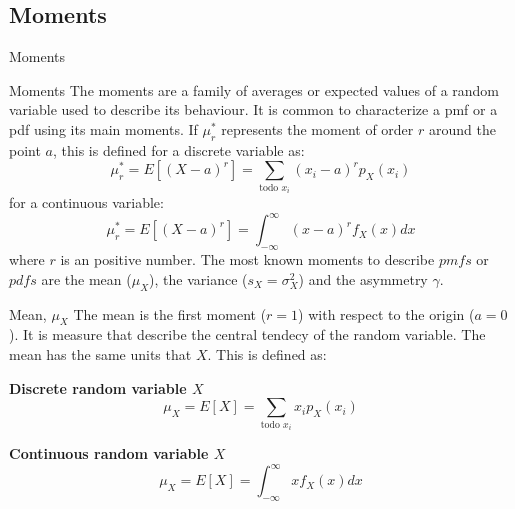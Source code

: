 \documentclass[8pt]{beamer}
\renewcommand{\emph}[1]{\textcolor{myorange}{#1}}
\begin{document}
\subsection{Moments}
\begin{frame}{Moments}
    
    \begin{block}{Moments}
        The \alert{moments} are a family of averages or expected values of a random variable used to describe its behaviour. It is common to characterize a \emph{pmf} or a \emph{pdf} using its main moments. If $\mu_r^*$ represents the moment of order $r$ around the point $a$, this is defined  for a discrete variable as:
        \[
            \mu_r^* = E \left[(X - a)^r \right] = \sum_{\text{todo $x_i$}} (x_i - a)^r p_X (x_i) 
        \]
for a continuous variable:
        \[
            \mu_r^* = E \left[(X - a)^r \right] = \int_{-\infty}^{\infty} (x- a)^r f_X (x) dx
        \]
        where $r$ is an positive number.  The most known moments to describe $pmfs$ or $pdfs$ are the \alert{mean} ($\mu_X$), the \alert{variance} ($s_X = \sigma_X^2$) and the asymmetry  $\gamma$.
    \end{block}
    \vspace{-2pt}
    \begin{block}{Mean, $\mu_X$}
        The \alert{mean} is the first moment ($r = 1$) with respect to the origin ($a = 0$). It is measure that describe the central tendecy of the random variable. The \alert{mean} has the same units that $X$. This is defined as:

\begin{minipage}[]{0.48\textwidth}
    \vspace{3pt}
\centering
\textbf{Discrete random variable $X$}
\[
\mu_X = E \left[ X \right] = \sum_{\text{todo $x_i$}} x_i p_X (x_i)
\]
\end{minipage}
\begin{minipage}[]{0.48\textwidth}
    \vspace{3pt}
\centering
\textbf{Continuous random variable $X$}
\[
\mu_X = E \left[ X \right] = \int_{-\infty}^{\infty} x f_X (x) dx
\]
\end{minipage}
\end{block}
\end{frame}
\end{document}
